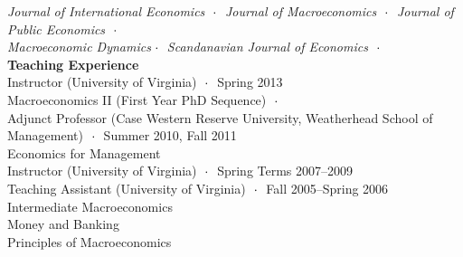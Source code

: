 \documentclass[oneside,11pt]{amsart}
\theoremstyle{definition}
\theoremstyle{remark}
\numberwithin{equation}{section}
\begin{document}
{\begin{tabbing}
\>
\textit{Journal of International Economics}  $\hskip.1cm \cdot \hskip.1cm$ 
\textit{Journal of Macroeconomics}                                 $\hskip.1cm \cdot \hskip.1cm$
\textit{Journal of Public Economics}                              $\hskip.1cm \cdot \hskip.1cm$
\> \\
\>
\textit{Macroeconomic Dynamics}$\hskip.1cm \cdot \hskip.1cm$ 
\textit{Scandanavian Journal of Economics}     $\hskip.1cm \cdot \hskip.1cm$     \> \\[0.5cm]
%
%
%
%
%
\Large{\textbf{Teaching Experience}} \> \> \`  \\[0.2cm]
\>  Instructor (University of Virginia) {\color{lgray} $\hskip.1cm  {\footnotesize \cdot} \hskip.1cm$}
{\footnotesize
    {\color{lgray} Spring 2013}
} \> \\
\> \hskip1.0cm Macroeconomics II (First Year PhD Sequence) {\color{lgray} $\hskip.1cm  {\footnotesize \cdot} \hskip.1cm$}  \> \\
\> Adjunct Professor (Case Western Reserve University, Weatherhead School of Management) {\color{lgray} $\hskip.1cm  {\footnotesize \cdot} \hskip.1cm$}
    {\footnotesize  {\color{lgray} Summer 2010, Fall 2011}}  \> \\
\> \hskip1.0cm Economics for Management \> \\
\>  Instructor (University of Virginia) {\color{lgray} $\hskip.1cm  {\footnotesize \cdot} \hskip.1cm$}
    {\footnotesize  {\color{lgray} Spring Terms 2007--2009}}\> \\
\>  Teaching Assistant (University of Virginia) {\color{lgray} $\hskip.1cm  {\footnotesize \cdot} \hskip.1cm$}
{\footnotesize
    {\color{lgray} Fall 2005--Spring 2006}} \> \\
\>  \hskip1.0cm Intermediate Macroeconomics  \> \\
\>  \hskip1.0cm Money and Banking  \> \\
\>  \hskip1.0cm Principles of Macroeconomics  \> \\


\end{tabbing}}
\end{document}
